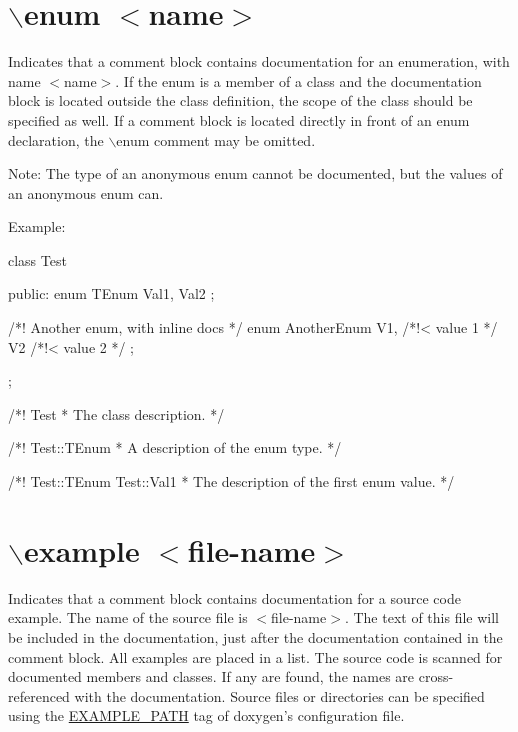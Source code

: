 \hypertarget{commands_cmdenum}{}\section{$\backslash$enum $<$name$>$}\label{commands_cmdenum}
 Indicates that a comment block contains documentation for an enumeration, with name $<$name$>$. If the enum is a member of a class and the documentation block is located outside the class definition, the scope of the class should be specified as well. If a comment block is located directly in front of an enum declaration, the $\backslash$enum comment may be omitted.

\begin{DoxyParagraph}{Note:}
The type of an anonymous enum cannot be documented, but the values of an anonymous enum can.
\end{DoxyParagraph}
\begin{DoxyParagraph}{Example:}

\begin{DoxyVerbInclude}
class Test
{
  public:
    enum TEnum { Val1, Val2 };

    /*! Another enum, with inline docs */
    enum AnotherEnum 
    { 
      V1, /*!< value 1 */
      V2  /*!< value 2 */
    };
};

/*! \class Test
 * The class description.
 */

/*! \enum Test::TEnum
 * A description of the enum type.
 */

/*! \var Test::TEnum Test::Val1
 * The description of the first enum value.
 */
\end{DoxyVerbInclude}
 
\end{DoxyParagraph}


 \hypertarget{commands_cmdexample}{}\section{$\backslash$example $<$file-\/name$>$}\label{commands_cmdexample}
 Indicates that a comment block contains documentation for a source code example. The name of the source file is $<$file-\/name$>$. The text of this file will be included in the documentation, just after the documentation contained in the comment block. All examples are placed in a list. The source code is scanned for documented members and classes. If any are found, the names are cross-\/referenced with the documentation. Source files or directories can be specified using the \hyperlink{config_cfg_example_path}{EXAMPLE\_\-PATH} tag of doxygen's configuration file.

